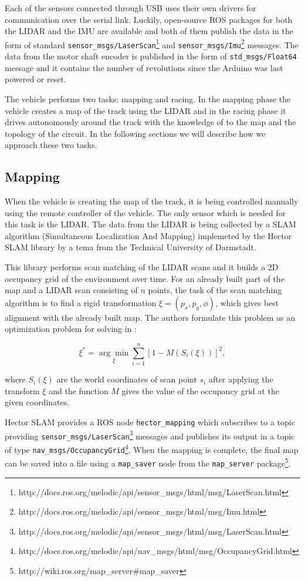 Each of the sensors connected through USB uses their own drivers for communication over the serial link. Luckily, open-source ROS packages for both the LIDAR and the IMU are available and both of them publish the data in the form of standard \verb|sensor_msgs/LaserScan|\footnote{http://docs.ros.org/melodic/api/sensor\_msgs/html/msg/LaserScan.html} and \verb|sensor_msgs/Imu|\footnote{http://docs.ros.org/melodic/api/sensor\_msgs/html/msg/Imu.html} messages. The data from the motor shaft encoder is published in the form of \verb|std_msgs/Float64| message and it contains the number of revolutions since the Arduino was last powered or reset.

The vehicle performs two tasks: mapping and racing. In the mapping phase the vehicle creates a map of the track using the LIDAR and in the racing phase it drives autonomously around the track with the knowledge of to the map and the topology of the circuit. In the following sections we will describe how we approach these two tasks.

\subsection{Mapping}

When the vehicle is creating the map of the track, it is being controlled manually using the remote controller of the vehicle. The only sensor which is needed for this task is the LIDAR. The data from the LIDAR is being collected by a SLAM algorithm (Simultaneous Localization And Mapping) implemeted by the Hector SLAM library by a tema from the Technical University of Darmstadt.

This library performs scan matching of the LIDAR scans and it builds a 2D occupancy grid of the environment over time. For an already built part of the map and a LIDAR scan consisting of $n$ points, the task of the scan matching algorithm is to find a rigid transformation $\xi =\left( p_x, p_y, \phi\right)$, which gives best alignment with the already built map. The authors formulate this problem as an optimization problem for solving in \cite{HectorSlam}:

$$
\xi^* = \underset{\xi}{\arg\min} \sum_{i=1}^n\left[ 1 - M\left( S_i\left( \xi\right)\right)\right]^2,
$$

where $S_i\left(\xi\right)$ are the world coordinates of scan point $s_i$ after applying the transform $\xi$ and the function $M$ gives the value of the occupancy grid at the given coordinates.

Hector SLAM provides a ROS node \verb|hector_mapping| which subscribes to a topic providing \verb|sensor_msgs/LaserScan|\footnote{http://docs.ros.org/melodic/api/sensor\_msgs/html/msg/LaserScan.html} messages and publishes its output in a topic of type \verb|nav_msgs/OccupancyGrid|\footnote{http://docs.ros.org/melodic/api/nav\_msgs/html/msg/OccupancyGrid.html}. When the mapping is complete, the final map can be saved into a file using a \verb|map_saver| node from the \verb|map_server| package\footnote{http://wiki.ros.org/map\_server\#map\_saver}.

